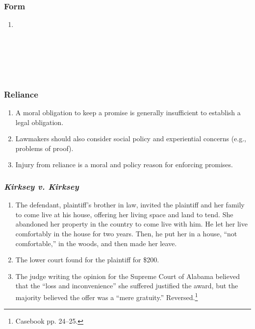 \subsubsection{Form}

\begin{enumerate}
    \item %
    ~\\\\\\\\\\\\
\end{enumerate}

\subsubsection{Reliance}

\begin{enumerate}
    \item A moral obligation to keep a promise is generally insufficient to 
    establish a legal obligation.
    \item Lawmakers should also consider social policy and experiential 
    concerns (e.g., problems of proof).
    \item Injury from reliance is a moral and policy reason for enforcing 
    promises.
\end{enumerate}

\subsubsection{\emph{Kirksey v. Kirksey}}

\begin{enumerate}
    \item The defendant, plaintiff's brother in law, invited the plaintiff and 
    her family to come live at his house, offering her living space and land 
    to tend. She abandoned her property in the country to come live with him. 
    He let her live comfortably in the house for two years. Then, he put her 
    in a house, ``not comfortable,'' in the woods, and then made her leave.
    \item The lower court found for the plaintiff for \$200.
    \item The judge writing the opinion for the Supreme Court of Alabama 
    believed that the ``loss and inconvenience'' she suffered justified the 
    award, but the majority believed the offer was a ``mere gratuity.'' 
    Reversed.\footnote{Casebook pp. 24--25.}
\end{enumerate}

